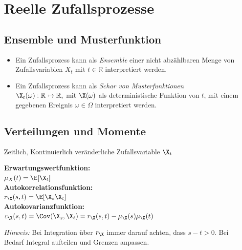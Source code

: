 \documentclass[german,color,6pt]{latex4ei/latex4ei_sheet}
\begin{document}
\section{Reelle Zufallsprozesse}
\begin{sectionbox}
	\subsection{Ensemble und Musterfunktion}
	\begin{itemize}
		\item Ein Zufallsprozess kann als \emph{Ensemble} einer nicht abzählbaren Menge von Zufallsvariablen $X_{t}$ mit $t \in \mathbb{R}$ interpretiert werden.
		\item Ein Zufallsprozess kann als \emph{Schar von Musterfunktionen} \\ $\X_{t}(\omega) : \mathbb{R} \mapsto \mathbb{R},$
		 mit $\X(\omega)$ als deterministische Funktion von $t$, mit einem gegebenen Ereignis $\omega \in \Omega$ interpretiert werden.
	\end{itemize}
\end{sectionbox}
\begin{sectionbox}
	\subsection{Verteilungen und Momente}
	Zeitlich, Kontinuierlich veränderliche Zufallsvariable $\X_t$\\

	\begin{emphbox}
		\raggedright
		\textbf{Erwartungswertfunktion:} \\ $\mu_X (t) = \E[\X_t]$ \\[0.5em]
		\textbf{Autokorrelationsfunktion:} \\ $r_{\X}(s,t) = \E[\X_s \X_t]$\\[0.5em]
		\textbf{Autokovarianzfunktion:} \\ $c_{\X}(s,t) = \Cov(\X_s,\X_t) = r_{\X}(s,t) - \mu_{\X}(s)\mu_{\X}(t)$
	\end{emphbox}
	\emph{Hinweis:} Bei Integration über $r_{\X}$ immer darauf achten, dass $s - t > 0$. Bei Bedarf Integral aufteilen und Grenzen anpassen.
\end{sectionbox}
\end{document}
